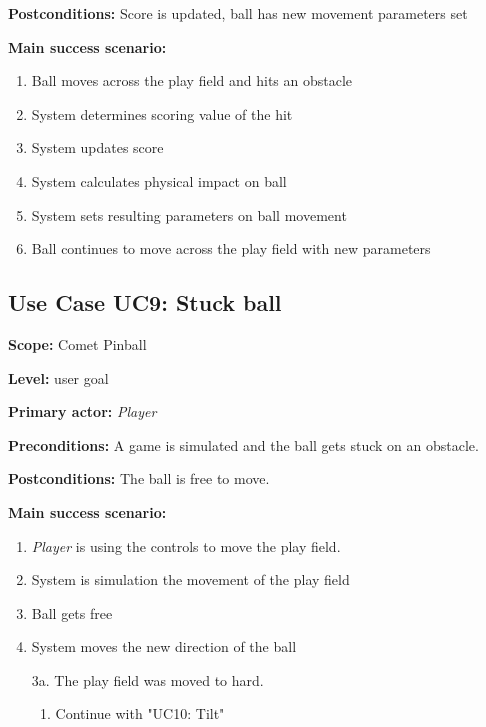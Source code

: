 \documentclass[fontsize=12pt,
               paper=a4,
               twoside=false,
               parskip=half,
               ]{scrartcl}
\begin{document}
\textbf{\textsf{Postconditions:}} Score is updated, ball has new movement parameters set

\textbf{\textsf{Main success scenario:}}

\begin{enumerate}[leftmargin=3em]
	\item Ball moves across the play field and hits an obstacle
	\item System determines scoring value of the hit
	\item System updates score
	\item System calculates physical impact on ball
	\item System sets resulting parameters on ball movement
	\item Ball continues to move across the play field with new parameters
\end{enumerate}




\subsection{Use Case UC9: Stuck ball}

\textbf{\textsf{Scope:}} Comet Pinball

\textbf{\textsf{Level:}} user goal

\textbf{\textsf{Primary actor:}} \emph{Player}

\textbf{\textsf{Preconditions:}} A game is simulated and the ball gets stuck on an obstacle.

\textbf{\textsf{Postconditions:}} The ball is free to move.

\textbf{\textsf{Main success scenario:}}

\begin{enumerate}[leftmargin=3em]
	\item \emph{Player} is using the controls to move the play field.
	\item System is simulation the movement of the play field
	\item Ball gets free
	\item System moves the new direction of the ball
\end{enumerate}

\begin{itemize}[leftmargin=3em]
	\item[3a.]  The play field was moved to hard.
	\begin{enumerate}
		\item Continue with "UC10: Tilt"
	\end{enumerate}
\end{itemize}
\end{document}
